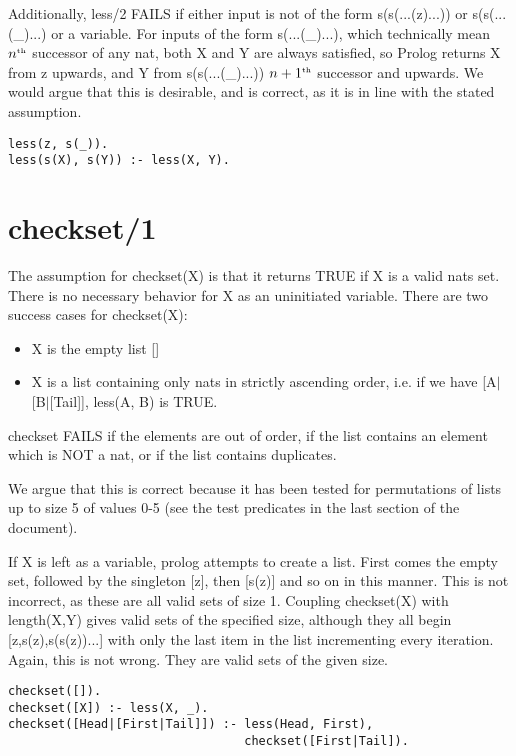 \documentclass{article}
\begin{document}
Additionally, less/2 FAILS if either input is not of the form s(s(...(z)...)) or s(s(...(\_)...) or a variable.
For inputs of the form s(...(\_)...), which technically mean $n^{\text{\tiny th}}$ successor of any nat, both X and Y are always satisfied, so Prolog returns X from z upwards, and Y from s(s(...(\_)...)) ${n+1}^{\text{\tiny th}}$ successor and upwards. We would argue that this is desirable, and is correct, as it is in line with the stated assumption.

\lstset{language=Prolog, frame=lines} \begin{lstlisting}[caption={less/2 definition}]
less(z, s(_)).
less(s(X), s(Y)) :- less(X, Y).
\end{lstlisting}

\section{checkset/1}
The assumption for checkset(X) is that it returns TRUE if X is a valid nats set. There is no necessary behavior for X as an uninitiated variable.
There are two success cases for checkset(X):
\begin{itemize}

    \item X is the empty list []

    \item X is a list containing only nats in strictly ascending order, i.e. if we have [A$\vert$[B$\vert$[Tail]], less(A, B) is TRUE.
\end{itemize}


checkset FAILS if the elements are out of order, if the list contains an element which is NOT a nat, or if the list contains duplicates.

We argue that this is correct because it has been tested for permutations of lists up to size 5 of values 0-5 (see the test predicates in the last section of the document).

If X is left as a variable, prolog attempts to create a list. First comes the empty set, followed by the singleton [z], then [s(z)] and so on in this manner. This is not incorrect, as these are all valid sets of size 1. Coupling checkset(X) with length(X,Y) gives valid sets of the specified size, although they all begin [z,s(z),s(s(z))...] with only the last item in the list incrementing every iteration. Again, this is not wrong. They are valid sets of the given size.

\lstset{language=Prolog, frame=lines} \begin{lstlisting}[caption={checkset/1 definition}]
checkset([]).
checkset([X]) :- less(X, _).
checkset([Head|[First|Tail]]) :- less(Head, First),
                                 checkset([First|Tail]).
  
\end{lstlisting}
\end{document}
